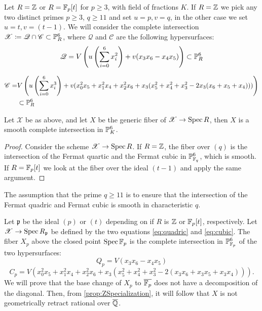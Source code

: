 Let $R = \Z$ or $R=\F_p[t]$ for $p \geq 3$, with field of fractions $K$. If $R=\Z$ we pick any two distinct primes $p \geq 3$, $q \geq 11$ and set $u=p,v=q$, in the other case we set $u=t,v=(t-1)$. We will consider the complete intersection $\mathscr{X} \coloneqq \mathscr{Q} \cap \mathscr{C} \subset \P_{R}^6$, where $\mathscr{Q}$ and $\mathscr{C}$ are the following hypersurfaces:
\begin{equation}
  \label{eq:quadric}
   \mathscr{Q} =V\left(  u \left(\sum_{i=0}^6 x_i^2 \right) + v(x_3x_6-x_4x_5) \right)  \subset \P_{R}^6
\end{equation}

\begin{equation}
  \label{eq:cubic}
  \begin{split}
  \mathscr{C} = &V\left( u \left(\sum_{i=0}^6 x_i^3 \right) + v(x_0^2x_5 + x_1^2x_4 + x_2^2x_6 + x_3(x_5^2+x_4^2+x_3^2 -2x_3(x_6 + x_5 + x_4))) \right) \\ &\subset \P_{R}^6
  \end{split}
\end{equation}

\begin{lemma}
  Let $\mathscr{X}$ be as above, and let $X$ be the generic fiber of $\mathscr{X} \to \Spec R$, then $X$ is a smooth complete intersection in $\P_{K}^6$.
\end{lemma}
\begin{proof}
  Consider the scheme $\mathscr{X} \to \Spec R$.  If $R=\Z$, the fiber over $(q)$ is the intersection of the Fermat quartic and the Fermat cubic in $\P_{\F_q }^6$, which is smooth. If $R=\F_p[t]$ we look at the fiber over the ideal $(t-1)$ and apply the same argument.
\end{proof}
\begin{remark}
\label{rmk:Characteristics}
  The assumption that the prime $q \geq 11$ is to ensure that the intersection of the Fermat quadric and Fermat cubic is smooth in characteristic $q$.
\end{remark}


Let $\mathfrak{p}$ be the ideal $(p)$ or $(t)$ depending on if $R$ is $\Z$ or $\F_p[t]$, respectively. Let $\mathscr{X} \to \Spec R_{\mathfrak{p}}$ be defined by the two equations \eqref{eq:quadric} and \eqref{eq:cubic}. The fiber $X_p$ above the closed point $\Spec \F_p$ is the complete intersection in $\P^6_{\F_p}$ of the two hypersurfaces:
\begin{equation}
  \label{eq:Qquadric}
  Q_p = V(x_3x_6-x_4x_5)
\end{equation}
\begin{equation}
  \label{eq:Qqubic}
  C_p = V \left(x_0^2x_5 + x_1^2x_4 + x_2^2x_6 + x_3(x_5^2+x_4^2+x_3^2 -2(x_3x_6 + x_3x_5 + x_3x_4)) \right).
\end{equation}
We will prove that the base change of $X_p$ to $\overline{\F_p}$ does not have a decomposition of the diagonal. Then, from \cref{prop:ZSpecialization}, it will follow that $X$ is not geometrically retract rational over $\overline{\Q}$.

